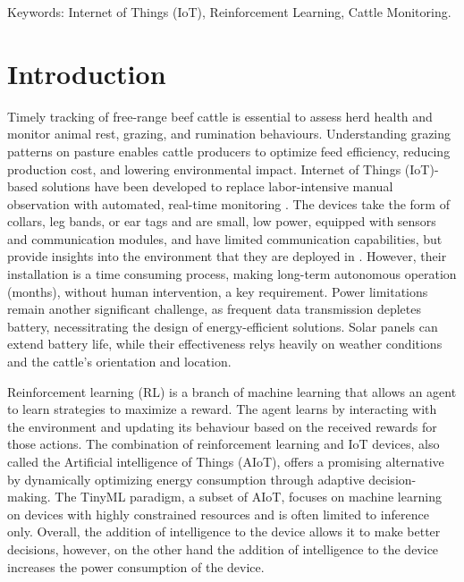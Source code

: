 \documentclass[10pt]{cai}
\begin{document}
\begin{keywords}{Keywords:}
Internet of Things (IoT), Reinforcement Learning, Cattle Monitoring.
\end{keywords}
\copyrightnotice

\section{Introduction}
Timely tracking of free-range beef cattle is essential to assess herd health and monitor animal rest, grazing, and rumination behaviours.
Understanding grazing patterns on pasture enables cattle producers to optimize feed efficiency, reducing production cost, and lowering environmental impact.
Internet of Things (IoT)-based solutions have been developed to replace labor-intensive manual observation with automated, real-time monitoring \cite{unoldIoTBasedCowHealth2020} \cite{yamsaniIoTBasedLivestockMonitoring2024}.
The devices take the form of collars, leg bands, or ear tags and are small, low power, equipped with sensors and communication modules, and have limited communication capabilities, but provide insights into the environment that they are deployed in \cite{unoldIoTBasedCowHealth2020} \cite{moutaouakilDigitalFarmingSurvey2023}.
However, their installation is a time consuming process, making long-term autonomous operation (months), without human intervention, a key requirement.
Power limitations remain another significant challenge, as frequent data transmission depletes battery, necessitrating the design of energy-efficient solutions.
Solar panels can extend battery life, while their effectiveness relys heavily on weather conditions and the cattle's orientation and location.

Reinforcement learning (RL) is a branch of machine learning that allows an agent to learn strategies to maximize a reward.
The agent learns by interacting with the environment and updating its behaviour based on the received rewards for those actions\cite{suttonReinforcementLearningIntroduction2020}.
The combination of reinforcement learning and IoT devices, also called the Artificial intelligence of Things (AIoT), offers a promising alternative by dynamically optimizing energy consumption through adaptive decision-making.
The TinyML paradigm, a subset of AIoT, focuses on machine learning on devices with highly constrained resources and is often limited to inference only\cite{rayReviewTinyMLStateoftheart2022}.
Overall, the addition of intelligence to the device allows it to make better decisions, however, on the other hand the addition of intelligence to the device increases the power consumption of the device.
\end{document}
